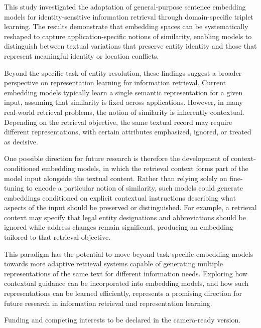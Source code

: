 \documentclass{article}
\begin{document}
This study investigated the adaptation of general-purpose sentence embedding models for identity-sensitive information retrieval through domain-specific triplet learning. The results demonstrate that embedding spaces can be systematically reshaped to capture application-specific notions of similarity, enabling models to distinguish between textual variations that preserve entity identity and those that represent meaningful identity or location conflicts.

Beyond the specific task of entity resolution, these findings suggest a broader perspective on representation learning for information retrieval. Current embedding models typically learn a single semantic representation for a given input, assuming that similarity is fixed across applications. However, in many real-world retrieval problems, the notion of similarity is inherently contextual. Depending on the retrieval objective, the same textual record may require different representations, with certain attributes emphasized, ignored, or treated as decisive.

One possible direction for future research is therefore the development of context-conditioned embedding models, in which the retrieval context forms part of the model input alongside the textual content. Rather than relying solely on fine-tuning to encode a particular notion of similarity, such models could generate embeddings conditioned on explicit contextual instructions describing what aspects of the input should be preserved or distinguished. For example, a retrieval context may specify that legal entity designations and abbreviations should be ignored while address changes remain significant, producing an embedding tailored to that retrieval objective.

This paradigm has the potential to move beyond task-specific embedding models towards more adaptive retrieval systems capable of generating multiple representations of the same text for different information needs. Exploring how contextual guidance can be incorporated into embedding models, and how such representations can be learned efficiently, represents a promising direction for future research in information retrieval and representation learning.

\begin{ack}
Funding and competing interests to be declared in the camera-ready version.
\end{ack}
\end{document}
